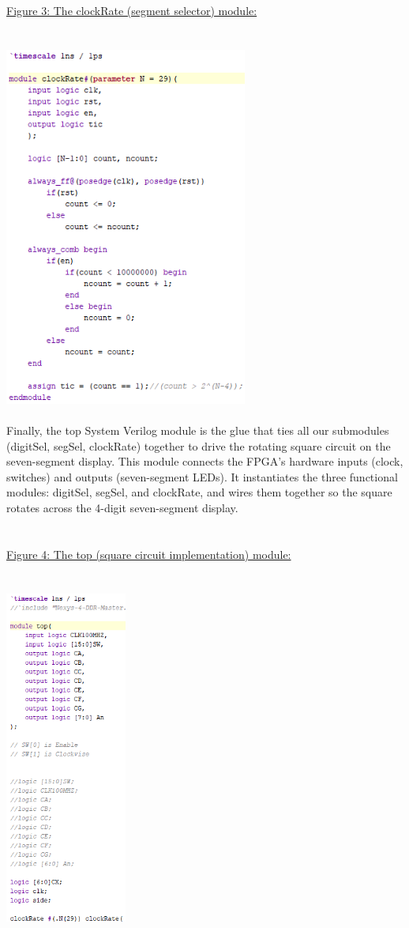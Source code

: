 \documentclass[12pt, letterpaper]{article}
\begin{document}
\underline{Figure 3: The clockRate (segment selector) module:}\\\\\\
\includegraphics[width=0.6\textwidth]{clockRate.sv (counter) module.png}
\\\\Finally, the top System Verilog module is the glue that ties all our submodules (digitSel, segSel, clockRate) together to drive the rotating square circuit on the seven-segment display. This module connects the FPGA's hardware inputs (clock, switches) and outputs (seven-segment LEDs). It instantiates the three functional modules: digitSel, segSel, and clockRate, and wires them together so the square rotates across the 4-digit seven-segment display.\\\\\\
\underline{Figure 4: The top (square circuit implementation) module:}\\\\\\
\includegraphics[width=0.3\textwidth]{top.sv module (top half).png}\\
\end{document}
